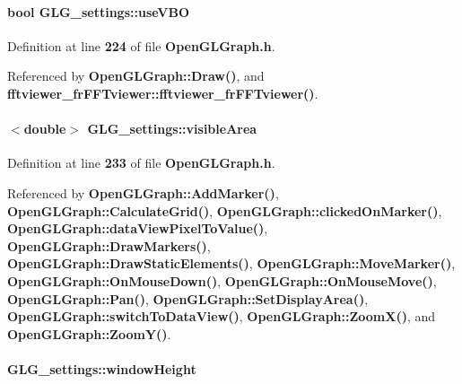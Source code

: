 \paragraph[{use\+V\+BO}]{\setlength{\rightskip}{0pt plus 5cm}bool G\+L\+G\+\_\+settings\+::use\+V\+BO}\label{structGLG__settings_ac255268edc88b9c9ff4a739398b0321a}


Definition at line {\bf 224} of file {\bf Open\+G\+L\+Graph.\+h}.



Referenced by {\bf Open\+G\+L\+Graph\+::\+Draw()}, and {\bf fftviewer\+\_\+fr\+F\+F\+Tviewer\+::fftviewer\+\_\+fr\+F\+F\+Tviewer()}.

\paragraph[{visible\+Area}]{$<$double$>$ G\+L\+G\+\_\+settings\+::visible\+Area}\label{structGLG__settings_a21ddb014b11c1ee08c11a2805fd94d85}


Definition at line {\bf 233} of file {\bf Open\+G\+L\+Graph.\+h}.



Referenced by {\bf Open\+G\+L\+Graph\+::\+Add\+Marker()}, {\bf Open\+G\+L\+Graph\+::\+Calculate\+Grid()}, {\bf Open\+G\+L\+Graph\+::clicked\+On\+Marker()}, {\bf Open\+G\+L\+Graph\+::data\+View\+Pixel\+To\+Value()}, {\bf Open\+G\+L\+Graph\+::\+Draw\+Markers()}, {\bf Open\+G\+L\+Graph\+::\+Draw\+Static\+Elements()}, {\bf Open\+G\+L\+Graph\+::\+Move\+Marker()}, {\bf Open\+G\+L\+Graph\+::\+On\+Mouse\+Down()}, {\bf Open\+G\+L\+Graph\+::\+On\+Mouse\+Move()}, {\bf Open\+G\+L\+Graph\+::\+Pan()}, {\bf Open\+G\+L\+Graph\+::\+Set\+Display\+Area()}, {\bf Open\+G\+L\+Graph\+::switch\+To\+Data\+View()}, {\bf Open\+G\+L\+Graph\+::\+Zoom\+X()}, and {\bf Open\+G\+L\+Graph\+::\+Zoom\+Y()}.

\paragraph[{window\+Height}]{ G\+L\+G\+\_\+settings\+::window\+Height}\label{structGLG__settings_af36695c4e320ee40ddfa73a701a01e52}


